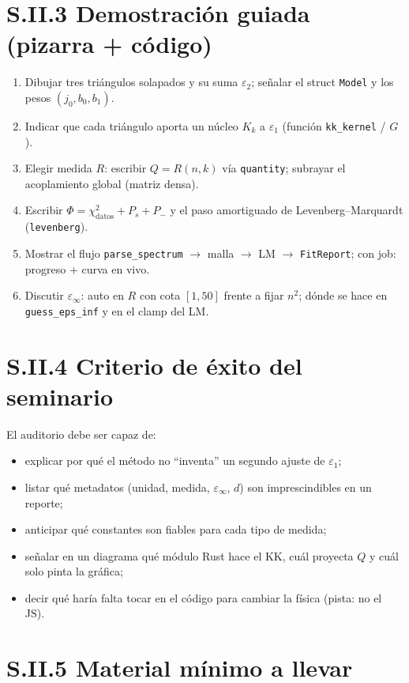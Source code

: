 \section*{S.II.3 Demostraci\'on guiada (pizarra + c\'odigo)}

\begin{enumerate}[leftmargin=*]
\item Dibujar tres tri\'angulos solapados y su suma $\varepsilon_2$; se\~nalar el struct \texttt{Model} y los pesos $(j_0,b_0,b_1)$.
\item Indicar que cada tri\'angulo aporta un n\'ucleo $K_k$ a $\varepsilon_1$ (funci\'on \texttt{kk\_kernel} / $G$).
\item Elegir medida $R$: escribir $Q=R(n,k)$ v\'ia \texttt{quantity}; subrayar el acoplamiento global (matriz densa).
\item Escribir $\Phi=\chi^{2}_{\mathrm{datos}}+P_s+P_-$ y el paso amortiguado de Levenberg--Marquardt (\texttt{levenberg}).
\item Mostrar el flujo \texttt{parse\_spectrum} $\to$ malla $\to$ LM $\to$ \texttt{FitReport}; con job: progreso + curva en vivo.
\item Discutir $\varepsilon_\infty$: auto en $R$ con cota $[1,50]$ frente a fijar $n^{2}$; d\'onde se hace en \texttt{guess\_eps\_inf} y en el clamp del LM.
\end{enumerate}

\section*{S.II.4 Criterio de \'exito del seminario}

El auditorio debe ser capaz de:
\begin{itemize}[leftmargin=*]
\item explicar por qu\'e el m\'etodo no ``inventa'' un segundo ajuste de $\varepsilon_1$;
\item listar qu\'e metadatos (unidad, medida, $\varepsilon_\infty$, $d$) son imprescindibles en un reporte;
\item anticipar qu\'e constantes son fiables para cada tipo de medida;
\item se\~nalar en un diagrama qu\'e m\'odulo Rust hace el KK, cu\'al proyecta $Q$ y cu\'al solo pinta la gr\'afica;
\item decir qu\'e har\'ia falta tocar en el c\'odigo para cambiar la f\'isica (pista: no el JS).
\end{itemize}

\section*{S.II.5 Material m\'inimo a llevar}

